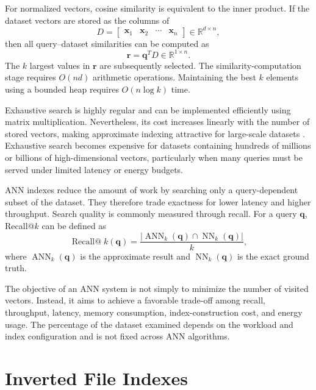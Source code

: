 For normalized vectors, cosine similarity is equivalent to the inner product. If the dataset vectors are stored as the columns of
\begin{equation}
D=\begin{bmatrix}\mathbf{x}_1 & \mathbf{x}_2 & \cdots & \mathbf{x}_n\end{bmatrix}\in\mathbb{R}^{d\times n},
\end{equation}
then all query--dataset similarities can be computed as
\begin{equation}
\mathbf{r}=\mathbf{q}^{T}D\in\mathbb{R}^{1\times n}.
\end{equation}
The \(k\) largest values in \(\mathbf{r}\) are subsequently selected. The similarity-computation stage requires \(O(nd)\) arithmetic operations. Maintaining the best \(k\) elements using a bounded heap requires \(O(n\log k)\) time.

Exhaustive search is highly regular and can be implemented efficiently using matrix multiplication. Nevertheless, its cost increases linearly with the number of stored vectors, making approximate indexing attractive for large-scale datasets \cite{faiss,hnsw}. Exhaustive search becomes expensive for datasets containing hundreds of millions or billions of high-dimensional vectors, particularly when many queries must be served under limited latency or energy budgets.

ANN indexes reduce the amount of work by searching only a query-dependent subset of the dataset. They therefore trade exactness for lower latency and higher throughput. Search quality is commonly measured through recall. For a query \(\mathbf{q}\), Recall@\(k\) can be defined as
\begin{equation}
\operatorname{Recall@}k(\mathbf{q})=\frac{\left|\operatorname{ANN}_k(\mathbf{q})\cap\operatorname{NN}_k(\mathbf{q})\right|}{k},
\label{eq:recall-at-k}
\end{equation}
where \(\operatorname{ANN}_k(\mathbf{q})\) is the approximate result and \(\operatorname{NN}_k(\mathbf{q})\) is the exact ground truth.

The objective of an ANN system is not simply to minimize the number of visited vectors. Instead, it aims to achieve a favorable trade-off among recall, throughput, latency, memory consumption, index-construction cost, and energy usage. The percentage of the dataset examined depends on the workload and index configuration and is not fixed across ANN algorithms.

\section{Inverted File Indexes}
\label{sec:ivf-background}

